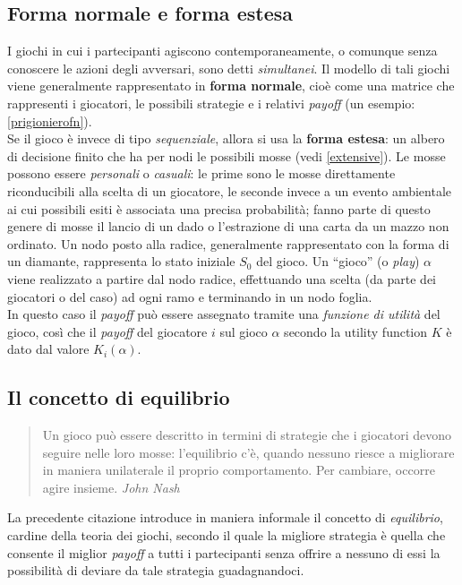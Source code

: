 \subsection{Forma normale e forma estesa}
I giochi in cui i partecipanti agiscono contemporaneamente, o comunque senza conoscere le azioni degli avversari, sono detti \emph{simultanei}.
Il modello di tali giochi viene generalmente rappresentato in \textbf{forma normale}, cioè come una matrice che rappresenti i giocatori, le possibili strategie e i relativi \emph{payoff} (un esempio: \ref{prigionierofn}).\\
Se il gioco è invece di tipo \emph{sequenziale}, allora si usa la \textbf{forma estesa}: un albero di decisione finito che ha per nodi le possibili mosse (vedi \ref{extensive}).
Le mosse possono essere \emph{personali} o \emph{casuali}: le prime sono le mosse direttamente riconducibili alla scelta di un giocatore, le seconde invece a un evento ambientale ai cui possibili esiti è associata una precisa probabilità; fanno parte di questo genere di mosse il lancio di un dado o l'estrazione di una carta da un mazzo non ordinato.
Un nodo posto alla radice, generalmente rappresentato con la forma di un diamante, rappresenta lo stato iniziale $S_0$ del gioco.
Un ``gioco'' (o \emph{play}) $\alpha$ viene realizzato a partire dal nodo radice, effettuando una scelta (da parte dei giocatori o del caso) ad ogni ramo e terminando in un nodo foglia.\\
In questo caso il \emph{payoff} può essere assegnato tramite una \emph{funzione di utilità} del gioco, così che il \emph{payoff} del giocatore $i$ sul gioco $\alpha$ secondo la utility function $K$ è dato dal valore $K_i(\alpha)$. \cite{frank}

\subsection{Il concetto di equilibrio}

\begin{quote}
Un gioco può essere descritto in termini di strategie che i giocatori devono seguire nelle loro mosse: l'equilibrio c'è, quando nessuno riesce a migliorare in maniera unilaterale il proprio comportamento. Per cambiare, occorre agire insieme. \emph{John Nash}
\end{quote}
La precedente citazione introduce in maniera informale il concetto di \emph{equilibrio}, cardine della teoria dei giochi, secondo il quale la migliore strategia è quella che consente il miglior \emph{payoff} a tutti i partecipanti senza offrire a nessuno di essi la possibilità di deviare da tale strategia guadagnandoci.\\

